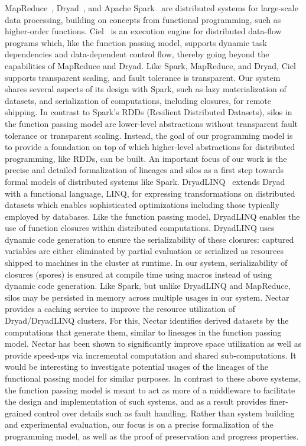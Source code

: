 \documentclass{jfp1}
\begin{document}
MapReduce~\cite{MapReduce}, Dryad~\cite{Dryad}, and Apache
Spark~\cite{Spark} are distributed systems for large-scale data
processing, building on concepts from functional programming, such as
higher-order functions. Ciel~\cite{Ciel} is an execution engine for
distributed data-flow programs which, like the function passing model,
supports dynamic task dependencies and data-dependent control flow,
thereby going beyond the capabilities of MapReduce and Dryad. Like
Spark, MapReduce, and Dryad, Ciel supports transparent scaling, and
fault tolerance is transparent. Our system shares several aspects of
its design with Spark, such as lazy materialization of datasets, and
serialization of computations, including closures, for remote
shipping. In contrast to Spark's RDDs (Resilient Distributed
Datasets), silos in the function passing model are lower-level
abstractions without transparent fault tolerance or transparent
scaling. Instead, the goal of our programming model is to provide a
foundation on top of which higher-level abstractions for distributed
programming, like RDDs, can be built. An important focus of our work
is the precise and detailed formalization of lineages and silos as a
first step towards formal models of distributed systems like Spark.
DryadLINQ~\cite{YuIFBEGC08} extends Dryad with a functional language,
LINQ, for expressing transformations on distributed datasets which
enables sophisticated optimizations including those typically employed
by databases. Like the function passing model, DryadLINQ enables the
use of function closures within distributed computations. DryadLINQ
uses dynamic code generation to ensure the serializability of these
closures: captured variables are either eliminated by partial
evaluation or serialized as resources shipped to machines in the
cluster at runtime. In our system, serializability of closures
(spores) is ensured at compile time using macros instead of using
dynamic code generation. Like Spark, but unlike DryadLINQ and
MapReduce, silos may be persisted in memory across multiple usages in
our system. Nectar~\cite{Nectar} provides a caching service to improve
the resource utilization of Dryad/DryadLINQ clusters. For this, Nectar
identifies derived datasets by the computations that generate them,
similar to lineages in the function passing model. Nectar has been
shown to significantly improve space utilization as well as provide
speed-ups via incremental computation and shared sub-computations. It
would be interesting to investigate potential usages of the lineages
of the functional passing model for similar purposes. In contrast to
these above systems, the function passing model is meant to act as
more of a middleware to facilitate the design and implementation of
such systems, and as a result provides finer-grained control over
details such as fault handling. Rather than system building and
experimental evaluation, our focus is on a precise formalization of
the programming model, as well as the proof of preservation and
progress properties.
\end{document}
